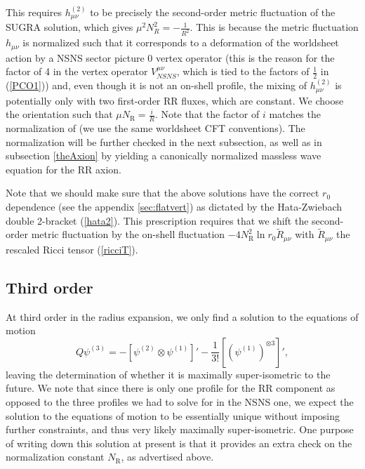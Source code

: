 \documentclass[12pt]{article}
\def\be{\begin{equation}}
\def\ee{\end{equation}}
\numberwithin{equation}{section}
\begin{document}
This requires $h_{\mu \nu}^{(2)}$ to be precisely the second-order metric fluctuation of the SUGRA solution, which gives $\mu^2 N_R^2 = -\frac{1}{R^2}$. This is because the metric fluctuation $h_{\mu \nu}$ is normalized such that it corresponds to a deformation of the worldsheet action by a NSNS sector picture 0 vertex operator (this is the reason for the factor of 4 in the vertex operator $V_{NSNS}^{\mu \nu}$, which is tied to the factors of $\frac{1}{2}$ in (\ref{PCO1})) and, even though it is not an on-shell profile, the mixing of $h_{\mu \nu}^{(2)}$ is potentially only with two first-order RR fluxes, which are constant. We choose the orientation such that $\mu N_{\text{R}} = \frac{i}{R}$.  Note that the factor of $i$ matches the normalization of \cite{Alexandrov:2021dyl} (we use the same worldsheet CFT conventions). The normalization will be further checked in the next subsection, as well as in subsection \ref{theAxion} by yielding a canonically normalized massless wave equation for the RR axion.

Note that we should make sure that the above solutions have the correct $r_0$ dependence (see the appendix \ref{sec:flatvert}) as dictated by the Hata-Zwiebach \cite{Hata:1993gf} double 2-bracket (\ref{hata2}). This prescription requires that we shift the second-order metric fluctuation by the on-shell fluctuation $-4 N_{\text{R}}^2 \ln r_0 \widetilde{R}_{\mu \nu}$ with $\widetilde{R}_{\mu \nu}$ the rescaled Ricci tensor (\ref{ricciT}).

\subsection{Third order}
At third order in the radius expansion, we only find a solution to the equations of motion
\be
Q \psi^{(3)} = -[\psi^{(2)} \otimes \psi^{(1)}]' - \frac{1}{3!} [(\psi^{(1)})^{\otimes 3}]',
\ee
leaving the determination of whether it is maximally super-isometric to the future. We note that since there is only one profile for the RR component as opposed to the three profiles we had to solve for in the NSNS one, we expect the solution to the equations of motion to be essentially unique without imposing further constraints, and thus very likely maximally super-isometric. One purpose of writing down this solution at present is that it provides an extra check on the normalization constant $N_{\text{R}}$, as advertised above.
\end{document}
